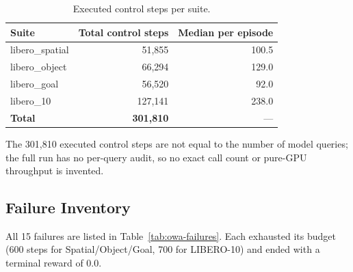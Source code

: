 \begin{table}[H]
  \centering
  \small
  \caption{Executed control steps per suite.}
  \label{tab:owa-steps}
  \begin{tabular}{@{}lrr@{}}
    \toprule
    Suite & Total control steps & Median per episode \\
    \midrule
    libero\_spatial & 51{,}855  & 100.5 \\
    libero\_object  & 66{,}294  & 129.0 \\
    libero\_goal    & 56{,}520  & 92.0  \\
    libero\_10      & 127{,}141 & 238.0 \\
    \midrule
    \textbf{Total}  & \textbf{301{,}810} & --- \\
    \bottomrule
  \end{tabular}
\end{table}

The 301{,}810 executed control steps are not equal to the number of model
queries; the full run has no per-query audit, so no exact call count or
pure-GPU throughput is invented.

\subsection{Failure Inventory}
\label{sec:owa-failures}

All 15 failures are listed in Table~\ref{tab:owa-failures}. Each exhausted its
budget (600 steps for Spatial/Object/Goal, 700 for LIBERO-10) and ended with a
terminal reward of 0.0.

